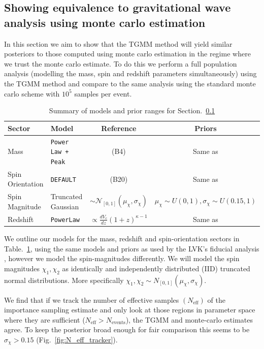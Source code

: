 \documentclass[twocolumn,usenames,dvipsnames,linenumbers]{aastex631}
\begin{document}
\subsection{Showing equivalence to gravitational wave analysis using monte carlo estimation}
\label{sec:WidePriorEquivalence}

In this section we aim to show that the TGMM method will yield similar posteriors to those computed using monte carlo estimation in the regime where we trust the monte carlo estimate. To do this we perform a full population analysis (modelling the mass, spin and redshift parameters simultaneously) using the TGMM method and compare to the same analysis using the standard monte carlo scheme with $10^5$ samples per event.

\begin{table}
	\centering
	\caption{Summary of models and prior ranges for Section.~\ref{sec:WidePriorEquivalence}}
	\label{tab:WidePriorModels}
	\begin{tabular}{llcc}
		\toprule
		\textbf{Sector} & \textbf{Model} & \textbf{Reference} & \textbf{Priors}\\ 
		\toprule
		\midrule
		Mass & \texttt{Power Law + Peak} & \cite{LVKPop}  (B4)& Same as \cite{LVKPop}\\ 
		Spin Orientation & \texttt{DEFAULT} & \cite{LVKPop} (B20) & Same as \cite{LVKPop}\\ 
		Spin Magnitude & Truncated Gaussian & $\sim \mathcal{N}_{[0,1]}(\mu_\chi, \sigma_\chi) $& $\mu_\chi \sim U(0,1), \sigma_\chi \sim U(0.15, 1)$\\ 
		Redshift & \texttt{PowerLaw} & $ \propto \frac{dV_c}{dz} (1+z)^{\kappa -1 }$ & Same as \cite{LVKPop}\\ 
		\bottomrule
	\end{tabular}
\end{table}



We outline our models for the mass, redshift and spin-orientation sectors in Table.~\ref{tab:WidePriorModels}, using the same models and priors as used by the LVK's fiducial analysis \cite{LVKPop}, however we model the spin-magnitudes differently. We will model the spin magnitudes $\chi_1, \chi_2$ as identically and independently distributed (IID) truncated normal distributions. More specifically $\chi_1, \chi_2 \sim N_{[0,1]}(\mu_\chi, \sigma_\chi)$. 

We find that if we track the number of effective samples $(N_{\text{eff}})$ of the importance sampling estimate and only look at those regions in parameter space where they are sufficient ($N_{\text{eff}} > N_{\text{events}}$), the TGMM and monte-carlo estimates agree. To keep the posterior broad enough for fair comparison this seems to be $\sigma_\chi > 0.15$ (Fig.~\ref{fig:N_eff_tracker}). 
\end{document}
